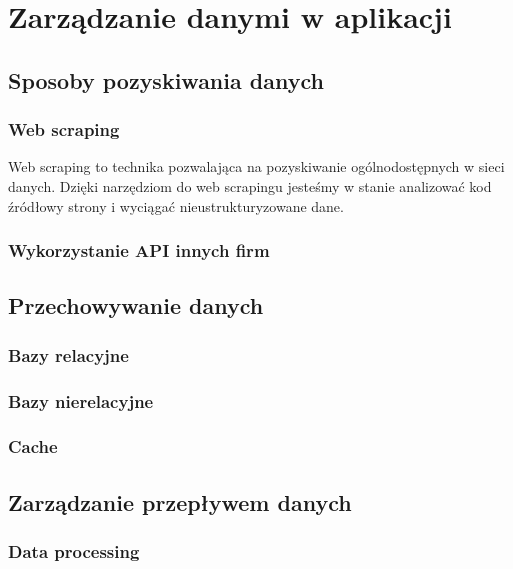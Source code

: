 \chapter{Zarządzanie danymi w aplikacji}

\section{Sposoby pozyskiwania danych}

\subsection{Web scraping}
Web scraping to technika pozwalająca na pozyskiwanie ogólnodostępnych w sieci danych. Dzięki narzędziom do web scrapingu jesteśmy w stanie analizować kod źródłowy strony i wyciągać nieustrukturyzowane dane.

\subsection{Wykorzystanie API innych firm}

\section{Przechowywanie danych}

\subsection{Bazy relacyjne}

\subsection{Bazy nierelacyjne}

\subsection{Cache}


\section{Zarządzanie przepływem danych}

\subsection{Data processing}